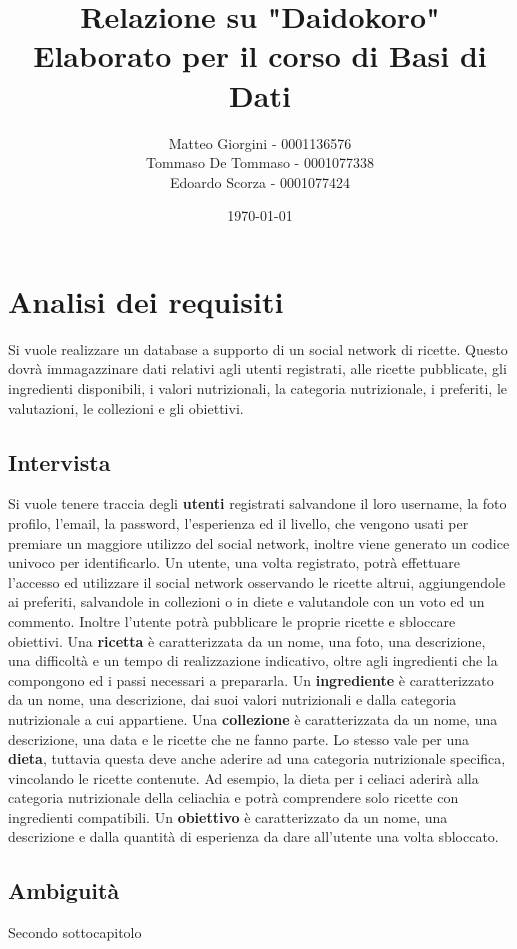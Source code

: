 ﻿\documentclass[a4paper,12pt]{report}
\title{Relazione su "Daidokoro" \\ Elaborato per il corso di Basi di Dati}
\author
{
    Matteo Giorgini - 0001136576 \\
    Tommaso De Tommaso - 0001077338 \\
    Edoardo Scorza - 0001077424 \\
}
\date{\today}
\begin{document}
\maketitle
\tableofcontents

\chapter{Analisi dei requisiti}
Si vuole realizzare un database a supporto di un social network di ricette.
Questo dovrà immagazzinare dati relativi agli utenti registrati, alle ricette pubblicate, gli ingredienti disponibili, i valori nutrizionali, la categoria nutrizionale, i preferiti, le valutazioni, le collezioni e gli obiettivi.

\section{Intervista}
Si vuole tenere traccia degli \textbf{utenti} registrati salvandone il loro username, la foto profilo, l'email, la password, l'esperienza ed il livello, che vengono usati per premiare un maggiore utilizzo del social network, inoltre viene generato un codice univoco per identificarlo. Un utente, una volta registrato, potrà effettuare l'accesso ed utilizzare il social network osservando le ricette altrui, aggiungendole ai preferiti, salvandole in collezioni o in diete e valutandole con un voto ed un commento. Inoltre l'utente potrà pubblicare le proprie ricette e sbloccare obiettivi.
Una \textbf{ricetta} è caratterizzata da un nome, una foto, una descrizione, una difficoltà e un tempo di realizzazione indicativo, oltre agli ingredienti che la compongono ed i passi necessari a prepararla.
Un \textbf{ingrediente} è caratterizzato da un nome, una descrizione, dai suoi valori nutrizionali e dalla categoria nutrizionale a cui appartiene.
Una \textbf{collezione} è caratterizzata da un nome, una descrizione, una data e le ricette che ne fanno parte. Lo stesso vale per una \textbf{dieta}, tuttavia questa deve anche aderire ad una categoria nutrizionale specifica, vincolando le ricette contenute. Ad esempio, la dieta per i celiaci aderirà alla categoria nutrizionale della celiachia e potrà comprendere solo ricette con ingredienti compatibili.
Un \textbf{obiettivo} è caratterizzato da un nome, una descrizione e dalla quantità di esperienza da dare all'utente una volta sbloccato.

\section{Ambiguità}
Secondo sottocapitolo
\end{document}
